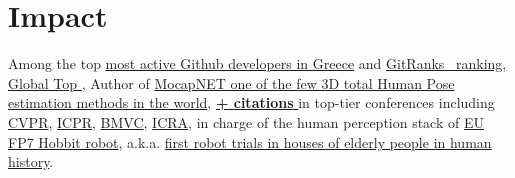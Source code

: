 \documentclass[a4,8pt]{article}
\begin{document}
 
\linespread{0.8}
\section{Impact}
\linespread{0.5}
\vspace{-0.1cm}
 Among the top \href{https://committers.top/greece}{most active Github developers in Greece} and \href{https://gitranks.com/profile/AmmarkoV}{GitRanks \gitrankstier\ ranking, Global Top \gitrankspercent}, Author of \href{https://github.com/FORTH-ModelBasedTracker/MocapNET}{MocapNET one of the few 3D total Human Pose estimation methods in the world}, \href{https://scholar.google.gr/citations?user=sDOdhtwAAAAJ&hl=en}{\bf{\citationcount+ citations} }in top-tier conferences including \href{http://users.ics.forth.gr/~argyros/mypapers/2015_06_CVPR_fsv.pdf}{CVPR}, \href{http://users.ics.forth.gr/~argyros/mypapers/2021_01_ICPR_Qammaz.pdf}{ICPR}, \href{http://users.ics.forth.gr/~argyros/mypapers/2021_11_BMVC_Qammaz.pdf}{BMVC}, \href{https://rasevents.org/uploads/documents/pdfviewer/e7/b9/223574-2731.pdf}{ICRA}, in charge of the human perception stack of \href{http://hobbit.acin.tuwien.ac.at/}{EU FP7 Hobbit robot}, a.k.a. \href{https://www.youtube.com/watch?v=eXbdmq6OIvU&}{first robot trials in houses of elderly people in human history}. \vspace{-0.2cm}

\linespread{0.8} 
\end{document}
